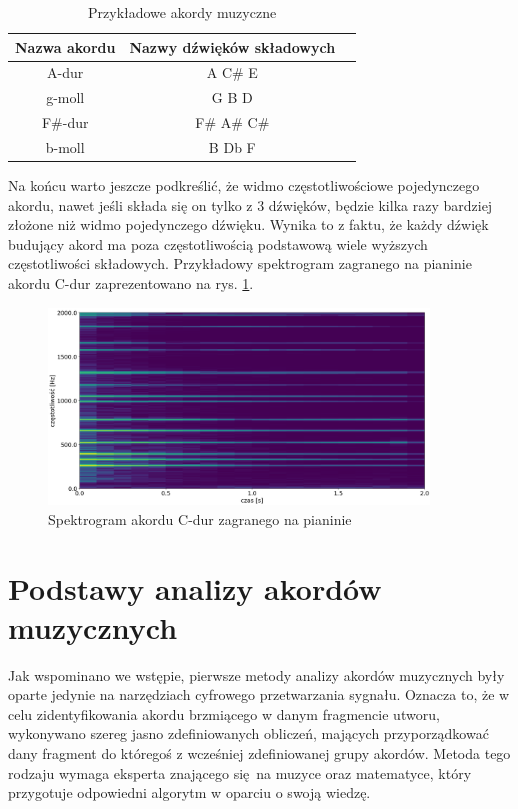 \begin{table}[htb]
    \centering
    \caption{Przykładowe akordy muzyczne}
    \label{tab:przykladowe_akordy}
    \begin{tabular}{|c|c|c|} \hline
        Nazwa akordu & Nazwy dźwięków składowych \\ \hline
        A-dur   & A  C\# E  \\
        g-moll  & G  B  D  \\
        F\#-dur  & F\# A\# C\# \\
        b-moll  & B  Db F  \\ \hline
    \end{tabular}
\end{table}

Na końcu warto jeszcze podkreślić, że widmo częstotliwościowe pojedynczego akordu, nawet jeśli
składa się on tylko z $3$ dźwięków, będzie kilka razy bardziej złożone niż widmo pojedynczego
dźwięku. Wynika to z faktu, że każdy dźwięk budujący akord ma poza częstotliwością podstawową wiele
wyższych częstotliwości składowych. Przykładowy spektrogram zagranego na pianinie akordu C-dur
zaprezentowano na rys. \ref{fig:spektrogram_cdur}.

\begin{figure}[htb]
    \centering
    \includegraphics[width=0.9\textwidth]{images/spektrogram_cdur}
    \caption{Spektrogram akordu C-dur zagranego na pianinie}
    \label{fig:spektrogram_cdur}
\end{figure}



\section{Podstawy analizy akordów muzycznych}

Jak wspominano we wstępie, pierwsze metody analizy akordów muzycznych były oparte jedynie na narzędziach cyfrowego przetwarzania sygnału. Oznacza to, że w celu zidentyfikowania akordu brzmiącego w danym fragmencie utworu, wykonywano szereg jasno zdefiniowanych obliczeń, mających przyporządkować dany fragment do któregoś z wcześniej zdefiniowanej grupy akordów. Metoda tego rodzaju wymaga eksperta znającego się na muzyce oraz matematyce, który przygotuje odpowiedni algorytm w oparciu o swoją wiedzę.

